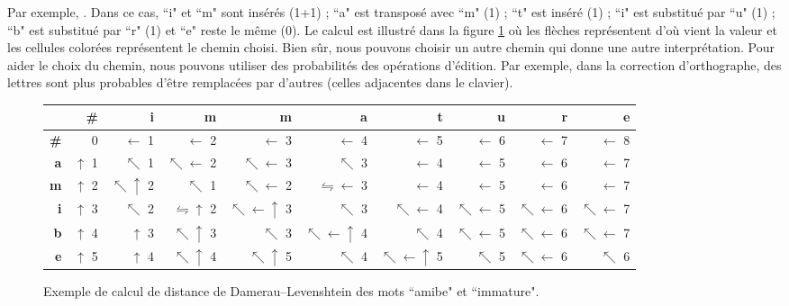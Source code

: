 \documentclass{KodeBook}
\begin{document}
Par exemple, . 
Dans ce cas, ``i" et ``m" sont insérés (1+1) ; ``a" est transposé avec ``m" (1) ; ``t" est inséré (1) ; ``i" est substitué par ``u" (1) ;  ``b" est substitué par ``r" (1) et ``e" reste le même (0).
Le calcul est illustré dans la figure \ref{fig:dam-laven-distance} où les flèches représentent d'où vient la valeur et les cellules colorées représentent le chemin choisi.
Bien sûr, nous pouvons choisir un autre chemin qui donne une autre interprétation.
Pour aider le choix du chemin, nous pouvons utiliser des probabilités des opérations d'édition.
Par exemple, dans la correction d'orthographe, des lettres sont plus probables d'être remplacées par d'autres (celles adjacentes dans le clavier).
\begin{figure}[ht]
	\centering
	\begin{tabular}{|r|r|r|r|r|r|r|r|r|r|}
		\hline
		&\bfseries \# &\bfseries i &\bfseries m &\bfseries m &\bfseries a &\bfseries t &\bfseries u &\bfseries r &\bfseries e \\
		\hline
		\bfseries \# & 0 & \cellcolor{green!25} $ \leftarrow $ 1 & \cellcolor{green!25} $ \leftarrow $ 2 & $ \leftarrow $ 3 & $ \leftarrow $ 4 & $ \leftarrow $ 5 & $ \leftarrow $ 6 & $ \leftarrow $ 7 & $ \leftarrow $ 8\\
		\hline
		\bfseries a & $ \uparrow $ 1 & $ \nwarrow $ 1 & $ \nwarrow\leftarrow $ 2 & $ \nwarrow\leftarrow $ 3 & $ \nwarrow $ 3 & $ \leftarrow $ 4 & $ \leftarrow $ 5 & $ \leftarrow $ 6 & $ \leftarrow $ 7 \\
		\hline
		\bfseries m & $ \uparrow $ 2 & $ \nwarrow\uparrow $ 2 & $\nwarrow $ 1 & $\nwarrow\leftarrow $ 2 & \cellcolor{green!25} $\leftrightharpoons\leftarrow $ 3 & \cellcolor{green!25} $\leftarrow $ 4 & $\leftarrow $ 5 & $\leftarrow $ 6 & $\leftarrow $ 7\\
		\hline
		\bfseries i & $ \uparrow $ 3 & $ \nwarrow $ 2 & $\leftrightharpoons\uparrow $ 2 & $\nwarrow\leftarrow\uparrow $ 3 & $\nwarrow $ 3 &  $\nwarrow\leftarrow $ 4 & \cellcolor{green!25} $\nwarrow\leftarrow $ 5 & $\nwarrow\leftarrow $ 6 & $\nwarrow\leftarrow $ 7\\
		\hline
		\bfseries b & $ \uparrow $ 4 & $ \uparrow $ 3 & $\nwarrow\uparrow $ 3 & $\nwarrow $ 3 & $\nwarrow\leftarrow\uparrow $ 4 & $\nwarrow $ 4 & $\nwarrow\leftarrow $ 5 & \cellcolor{green!25} $\nwarrow\leftarrow $ 6 & $\nwarrow\leftarrow $ 7\\
		\hline
		\bfseries e & $ \uparrow $ 5 & $ \uparrow $ 4 & $\nwarrow\uparrow $ 4 & $\nwarrow\uparrow $ 5 & $\nwarrow $ 4 & $\nwarrow\leftarrow\uparrow $ 5 & $\nwarrow $ 5 & $\nwarrow\leftarrow $ 6 & \cellcolor{green!25} $\nwarrow $ 6\\
		\hline
	\end{tabular}
	\caption[Exemple de calcul de distance de Damerau–Levenshtein]{Exemple de calcul de distance de Damerau–Levenshtein des mots ``amibe"  et ``immature".}
	\label{fig:dam-laven-distance}
\end{figure}
\end{document}
